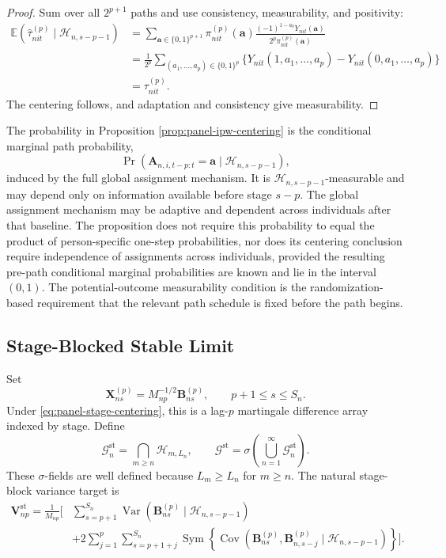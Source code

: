 \documentclass[11pt]{article}
\renewcommand\vec[1]{\boldsymbol{#1}}
\newcommand\mat[1]{\mathbf{#1}}
\DeclareMathOperator{\Cov}{Cov}
\DeclareMathOperator{\Var}{Var}
\DeclareMathOperator{\Sym}{Sym}
\newcommand{\E}{\mathbb{E}}
\newcommand{\G}{\mathcal{G}}
\newcommand{\Hcal}{\mathcal{H}}
\theoremstyle{definition}
\begin{document}
\begin{proof}
Sum over all \(2^{p+1}\) paths and use consistency, measurability, and positivity:
\begin{align*}
\E(\widehat\tau^{(p)}_{nit}\mid\Hcal_{n,s-p-1})
&=
\sum_{\vec a\in\{0,1\}^{p+1}}
\pi^{(p)}_{nit}(\vec a)
\frac{(-1)^{1-a_0}Y_{nit}(\vec a)}
{2^p\pi^{(p)}_{nit}(\vec a)}\\
&=
\frac1{2^p}
\sum_{(a_1,\ldots,a_p)\in\{0,1\}^p}
\Big\{Y_{nit}(1,a_1,\ldots,a_p)
-Y_{nit}(0,a_1,\ldots,a_p)\Big\}\\
&=\tau^{(p)}_{nit}.
\end{align*}
\vspace{-3pt}The centering follows, and adaptation and consistency give measurability.
\end{proof}

The probability in Proposition \ref{prop:panel-ipw-centering} is the
conditional marginal path probability,\vspace{-3pt}
\[
\Pr\!\left(
\vec A_{n,i,t-p:t}=\vec a
\mid\Hcal_{n,s-p-1}
\right),
\]
\vspace{-3pt}induced by the full global assignment mechanism. It is
\(\Hcal_{n,s-p-1}\)-measurable and may depend only on information
available before stage \(s-p\). The global assignment mechanism may be adaptive and dependent across individuals after
that baseline. The proposition does not require this probability to
equal the product of person-specific one-step probabilities, nor
does its centering conclusion require independence of assignments
across individuals, provided the resulting pre-path conditional
marginal probabilities are known and lie in the interval $(0, 1)$. The potential-outcome measurability condition is the randomization-based requirement that the relevant path schedule is fixed before the path begins. 

\subsection{Stage-Blocked Stable Limit}
\label{sec:stage-blocked-stable-limit}

Set
\[
\vec X^{(p)}_{ns}=M_{np}^{-1/2}\vec B^{(p)}_{ns},
\qquad p+1\leq s\leq S_n.
\]
Under \eqref{eq:panel-stage-centering}, this is a lag-\(p\) martingale difference array indexed by stage.
Define
\[
\G_n^{\mathrm{st}}
=\bigcap_{m\geq n}\Hcal_{m,L_n},
\qquad
\G^{\mathrm{st}}
=\sigma\!\left(\bigcup_{n=1}^{\infty}\G_n^{\mathrm{st}}\right).
\]
These \(\sigma\)-fields are well defined because \(L_m\geq L_n\) for \(m\geq n\).
The natural stage-block variance target is
\begin{equation}\label{eq:panel-block-variance}
\begin{aligned}
\mat V_{np}^{\mathrm{st}}
=\frac1{M_{np}}\Bigg[
&\sum_{s=p+1}^{S_n}
\Var(\vec B^{(p)}_{ns}\mid\Hcal_{n,s-p-1})\\
&+
2\sum_{j=1}^{p}\sum_{s=p+1+j}^{S_n}
\Sym\!\left\{
\Cov(\vec B^{(p)}_{ns},\vec B^{(p)}_{n,s-j}
\mid\Hcal_{n,s-p-1})
\right\}
\Bigg].
\end{aligned}
\end{equation}
\end{document}
